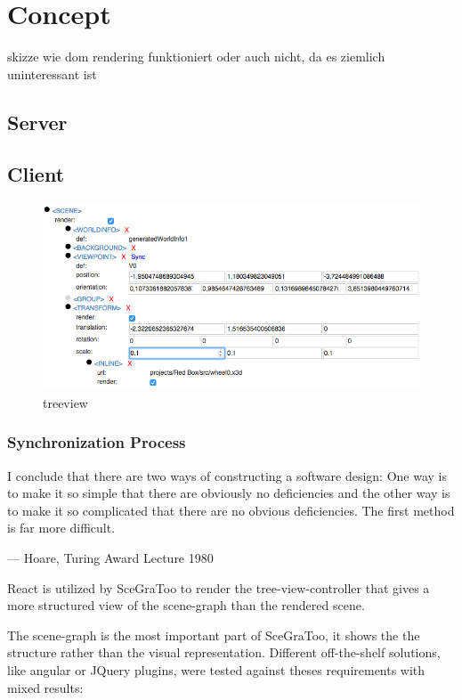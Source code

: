 
\section{Concept}
\label{concept}

skizze wie dom rendering funktioniert oder auch nicht, da es ziemlich
uninteressant ist

\subsection{Server}
\label{server}

\subsection{Client}
\label{client}

\begin{figure}[htbp]
  \centering
  \includegraphics[width=12cm]{../assets/treeview.png}
  \caption{treeview}
  \label{fig:tree-view}
\end{figure}

\clearpage
\subsubsection{Synchronization Process}
\label{synchronization-process}

\epigraph{I conclude that there are two ways of constructing a software design:
One way is to make it so simple that there are obviously no deficiencies
and the other way is to make it so complicated that there are no obvious
deficiencies. The first method is far more difficult.}{--- Hoare, Turing Award Lecture 1980}

React is utilized by SceGraToo to render the tree-view-controller that
gives a more structured view of the scene-graph than the rendered scene.

The scene-graph is the most important part of SceGraToo, it shows the
the structure rather than the visual representation. Different
off-the-shelf solutions, like angular or JQuery plugins, were tested
against theses requirements with mixed results:

